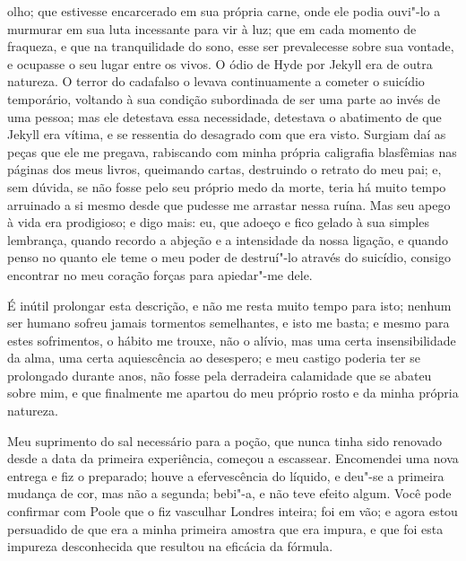 olho; que estivesse encarcerado em sua própria carne, onde ele podia
ouvi"-lo a murmurar em sua luta incessante para vir à luz; que em cada
momento de fraqueza, e que na tranquilidade do sono, esse ser
prevalecesse sobre sua vontade, e ocupasse o seu lugar entre os vivos. 
O ódio de Hyde por Jekyll era de outra natureza. O terror do cadafalso
o levava continuamente a cometer o suicídio temporário, voltando à sua
condição subordinada de ser uma parte ao invés de uma pessoa; mas ele
detestava essa necessidade, detestava o abatimento de que Jekyll era
vítima, e se ressentia do desagrado com que era visto.  Surgiam daí as
peças que ele me pregava, rabiscando com minha própria caligrafia
blasfêmias nas páginas dos meus livros, queimando cartas, destruindo o
retrato do meu pai; e, sem dúvida, se não fosse pelo seu próprio medo
da morte, teria há muito tempo arruinado a si mesmo desde que pudesse
me arrastar nessa ruína. Mas seu apego à vida era prodigioso; e digo
mais: eu, que adoeço e fico gelado à sua simples lembrança, quando
recordo a abjeção e a intensidade da nossa ligação, e quando penso no
quanto ele teme o meu poder de destruí"-lo através do suicídio, consigo
encontrar no meu coração forças para apiedar"-me dele.

É inútil prolongar esta descrição, e não me resta muito tempo para isto;
nenhum ser humano sofreu jamais tormentos semelhantes, e isto me basta;
e mesmo para estes sofrimentos, o hábito me trouxe, não o alívio, mas
uma certa insensibilidade da alma, uma certa aquiescência ao desespero;
e meu castigo poderia ter se prolongado durante anos, não fosse pela
derradeira calamidade que se abateu sobre mim, e que finalmente me
apartou do meu próprio rosto e da minha própria natureza.  

Meu suprimento do sal necessário para a poção, que nunca tinha sido
renovado desde a data da primeira experiência, começou a escassear. 
Encomendei uma nova entrega e fiz o preparado; houve a efervescência do
líquido, e deu"-se a primeira mudança de cor, mas não a segunda; bebi"-a,
e não teve efeito algum.  Você pode confirmar com Poole que o fiz
vasculhar Londres inteira; foi em vão; e agora estou persuadido de que
era a minha primeira amostra que era impura, e que foi esta impureza
desconhecida que resultou na eficácia da fórmula.

